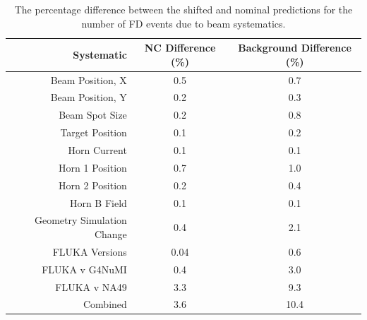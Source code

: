 \begin{table}[h]
  \begin{center}
    \caption[Beam Systematic Errors]{The percentage difference between the shifted and nominal predictions for the number of FD events due to beam systematics.}
    \label{tab:SystBeam}
    \begin{tabular}{r c c}
      \hline\hline
      Systematic & NC Difference (\%) & Background Difference (\%) \\
      \hline
      Beam Position, X & 0.5 & 0.7 \\
      Beam Position, Y & 0.2 & 0.3 \\
      Beam Spot Size & 0.2 & 0.8 \\
      Target Position & 0.1 & 0.2 \\
      Horn Current & 0.1 & 0.1 \\
      Horn 1 Position & 0.7 & 1.0 \\
      Horn 2 Position & 0.2 & 0.4 \\
      Horn B Field & 0.1 & 0.1 \\
      Geometry Simulation Change & 0.4 & 2.1 \\
      FLUKA Versions & 0.04 & 0.6 \\
      FLUKA v G4NuMI & 0.4 & 3.0 \\
      FLUKA v NA49 & 3.3 & 9.3 \\
      \hline
      Combined & 3.6 & 10.4 \\
      \hline
    \end{tabular}
  \end{center}
\end{table}

